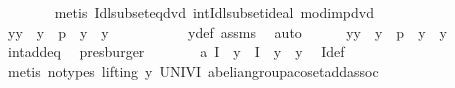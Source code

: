 \begin{isabellebody}
\ \ \ \ \ \ \isamarkupfalse%
\ {\isacharparenleft}{\kern0pt}metis\ Idl{\isacharunderscore}{\kern0pt}subset{\isacharunderscore}{\kern0pt}eq{\isacharunderscore}{\kern0pt}dvd\ int{\isacharunderscore}{\kern0pt}Idl{\isacharunderscore}{\kern0pt}subset{\isacharunderscore}{\kern0pt}ideal\ mod{\isacharunderscore}{\kern0pt}{}{\isacharunderscore}{\kern0pt}imp{\isacharunderscore}{\kern0pt}dvd{\isacharparenright}{\kern0pt}\isanewline
\ \ \ \ \isamarkupfalse%
\ y{\isacharunderscore}{\kern0pt}{}{\isacharcolon}{\kern0pt}{\isachardoublequoteopen}y\ {\isacharplus}{\kern0pt}\ y{\isacharprime}{\kern0pt}\ {\isacharless}{\kern0pt}\ p\ {\isasymand}\ y\ {\isacharplus}{\kern0pt}\ y{\isacharprime}{\kern0pt}\ {\isasymge}\ {}{\isachardoublequoteclose}\ \isanewline
\ \ \ \ \ \ \isamarkupfalse%
\ y{\isacharunderscore}{\kern0pt}def\ assms{\isacharparenleft}{\kern0pt}{}{\isacharparenright}{\kern0pt}\ \isamarkupfalse%
\ auto\isanewline
\ \ \ \ \isamarkupfalse%
\ y{\isacharunderscore}{\kern0pt}{}{\isacharcolon}{\kern0pt}{\isachardoublequoteopen}y\ {\isasymoplus}\isactrlbsub {\isasymZ}\isactrlesub \ y{\isacharprime}{\kern0pt}\ {\isacharless}{\kern0pt}\ p\ {\isasymand}\ y\ {\isasymoplus}\isactrlbsub {\isasymZ}\isactrlesub \ y{\isacharprime}{\kern0pt}\ {\isasymge}\ {}{\isachardoublequoteclose}\ \isamarkupfalse%
\ int{\isacharunderscore}{\kern0pt}add{\isacharunderscore}{\kern0pt}eq\ \isamarkupfalse%
\ presburger\isanewline
\ \ \ \ \isamarkupfalse%
\ \isamarkupfalse%
\ a{}{\isacharcolon}{\kern0pt}\ {\isachardoublequoteopen}I\ {\isacharplus}{\kern0pt}{\isachargreater}{\kern0pt}\isactrlbsub {\isasymZ}\isactrlesub \ y{\isacharprime}{\kern0pt}\ {\isacharequal}{\kern0pt}\ I\ {\isacharplus}{\kern0pt}{\isachargreater}{\kern0pt}\isactrlbsub {\isasymZ}\isactrlesub \ {\isacharparenleft}{\kern0pt}y\ {\isasymoplus}\isactrlbsub {\isasymZ}\isactrlesub \ y{\isacharprime}{\kern0pt}{\isacharparenright}{\kern0pt}{\isachardoublequoteclose}\ \isamarkupfalse%
\ I{\isacharunderscore}{\kern0pt}def\ \isanewline
\ \ \ \ \ \ \isamarkupfalse%
\ {\isacharparenleft}{\kern0pt}metis\ {\isacharparenleft}{\kern0pt}no{\isacharunderscore}{\kern0pt}types{\isacharcomma}{\kern0pt}\ lifting{\isacharparenright}{\kern0pt}\ y{\isacharunderscore}{\kern0pt}{}\ UNIV{\isacharunderscore}{\kern0pt}I\ abelian{\isacharunderscore}{\kern0pt}group{\isachardot}{\kern0pt}a{\isacharunderscore}{\kern0pt}coset{\isacharunderscore}{\kern0pt}add{\isacharunderscore}{\kern0pt}assoc\ \isanewline

\end{isabellebody}
